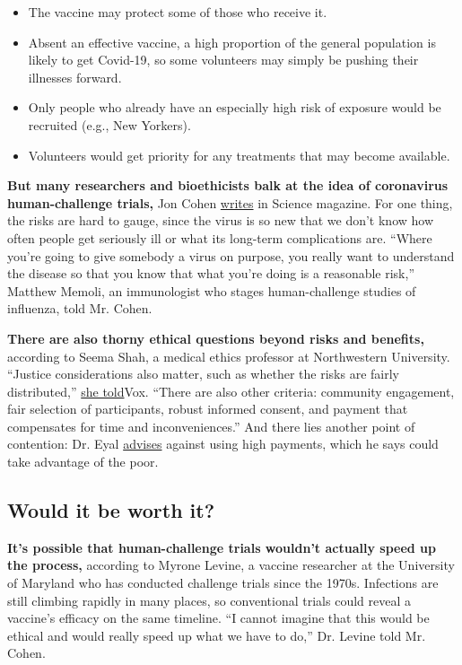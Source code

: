 \begin{itemize}
\item
  The vaccine may protect some of those who receive it.
\item
  Absent an effective vaccine, a high proportion of the general
  population is likely to get Covid-19, so some volunteers may simply be
  pushing their illnesses forward.
\item
  Only people who already have an especially high risk of exposure would
  be recruited (e.g., New Yorkers).
\item
  Volunteers would get priority for any treatments that may become
  available.
\end{itemize}

\textbf{But many researchers and bioethicists balk at the idea of
coronavirus human-challenge trials,} Jon Cohen
\href{https://www.sciencemag.org/news/2020/03/speed-coronavirus-vaccine-testing-deliberately-infecting-volunteers-not-so-fast-some\#}{writes}
in Science magazine. For one thing, the risks are hard to gauge, since
the virus is so new that we don't know how often people get seriously
ill or what its long-term complications are. ``Where you're going to
give somebody a virus on purpose, you really want to understand the
disease so that you know that what you're doing is a reasonable risk,''
Matthew Memoli, an immunologist who stages human-challenge studies of
influenza, told Mr. Cohen.

\textbf{There are also thorny ethical questions beyond risks and
benefits,} according to Seema Shah, a medical ethics professor at
Northwestern University. ``Justice considerations also matter, such as
whether the risks are fairly distributed,''
\href{https://www.vox.com/future-perfect/2020/4/9/21209593/coronavirus-vaccine-human-trials-explained}{she
told}Vox. ``There are also other criteria: community engagement, fair
selection of participants, robust informed consent, and payment that
compensates for time and inconveniences.'' And there lies another point
of contention: Dr. Eyal
\href{https://www.nature.com/articles/d41586-020-00927-3}{advises}
against using high payments, which he says could take advantage of the
poor.

\hypertarget{would-it-be-worth-it}{%
\subsection{Would it be worth it?}\label{would-it-be-worth-it}}

\textbf{It's possible that human-challenge trials wouldn't actually
speed up the process,} according to Myrone Levine, a vaccine researcher
at the University of Maryland who has conducted challenge trials since
the 1970s. Infections are still climbing rapidly in many places, so
conventional trials could reveal a vaccine's efficacy on the same
timeline. ``I cannot imagine that this would be ethical and would really
speed up what we have to do,'' Dr. Levine told Mr. Cohen.

